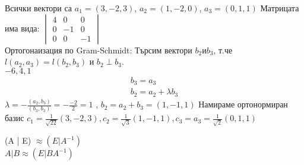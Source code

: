 \documentclass{article}
\begin{document}
Всички вектори са 
$a_1 = (3,-2,3) $, $a_2 = (1,-2,0) $, $a_3 =(0,1,1)$ 
Матрицата има вида:
$\begin{vmatrix}
4 & 0 & 0  \\ 
0 & -1 & 0 \\ 
0 & 0 & -1  
\end{vmatrix}
$ \\
Ортогонаизация по Gram-Schmidt:
Търсим вектори $b_2 и b_3 $, т.че $l(a_2,a_3) = l(b_2,b_3)$ и $b_2 \perp b_3 $. \\
$-6,4,1$
\begin{align*}
b_3 = a_3\\
  b_2 = a_2 + \lambda b_3
\end{align*}
$\lambda = - \frac{(a_2,b_3)}{(b_3,b_3)} = -\frac{-2}{2} = 1$ , $b_2 = a_2 + b_3 = (1,-1,1) $
Намираме ортонормиран базис
$c_1 = \frac{1}{\sqrt{22}}(3,-2,3) , c_2=\frac{1}{\sqrt{3}}(1,-1,1) , c_3= a_3 = \frac{1}{\sqrt{2}}(0,1,1) $

\vspace{2cm}
(A | E) $\approx (E|A^{-1}) $ \\
$A | B \approx (E | BA^{-1}) $
\end{document}
